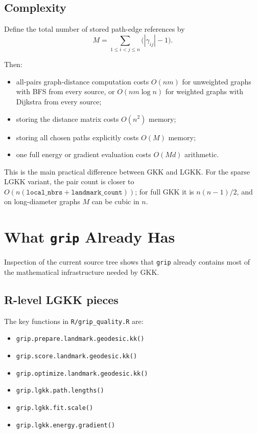 \documentclass[11pt]{article}
\begin{document}
\subsection{Complexity}

Define the total number of stored path-edge references by
\[
M = \sum_{1 \le i < j \le n} \bigl(|\gamma_{ij}| - 1\bigr).
\]

Then:
\begin{itemize}[leftmargin=1.5em]
\item all-pairs graph-distance computation costs
$O(nm)$ for unweighted graphs with BFS from every source, or
$O(nm \log n)$ for weighted graphs with Dijkstra from every source;
\item storing the distance matrix costs $O(n^2)$ memory;
\item storing all chosen paths explicitly costs $O(M)$ memory;
\item one full energy or gradient evaluation costs $O(Md)$ arithmetic.
\end{itemize}

This is the main practical difference between GKK and LGKK. For the sparse LGKK
variant, the pair count is closer to
$O(n(\texttt{local\_nbrs} + \texttt{landmark\_count}))$; for full GKK it is
$n(n-1)/2$, and on long-diameter graphs $M$ can be cubic in $n$.

\section{What \texttt{grip} Already Has}

Inspection of the current source tree shows that \texttt{grip} already contains
most of the mathematical infrastructure needed by GKK.

\subsection{R-level LGKK pieces}

The key functions in \texttt{R/grip\_quality.R} are:
\begin{itemize}[leftmargin=1.5em]
\item \texttt{grip.prepare.landmark.geodesic.kk()}
\item \texttt{grip.score.landmark.geodesic.kk()}
\item \texttt{grip.optimize.landmark.geodesic.kk()}
\item \texttt{grip.lgkk.path.lengths()}
\item \texttt{grip.lgkk.fit.scale()}
\item \texttt{grip.lgkk.energy.gradient()}
\end{itemize}
\end{document}
